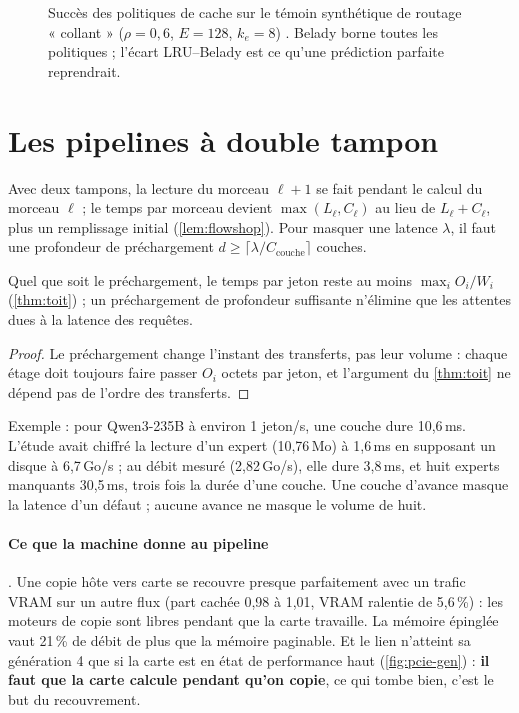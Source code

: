 \begin{figure}[ht]
\centering
\GrapheLocalite
\caption[Succès des politiques de cache sur un routage synthétique]{Succès des politiques de cache sur le témoin synthétique de routage « collant » ($\rho = 0{,}6$, $E = 128$, $k_e = 8$) \calc. Belady borne toutes les politiques ; l'écart LRU--Belady est ce qu'une prédiction parfaite reprendrait.}
\label{fig:localite}
\end{figure}

\section{Les pipelines à double tampon}\label{sec:double-tampon}

Avec deux tampons, la lecture du morceau $\ell+1$ se fait pendant le calcul du morceau $\ell$ ; le temps par morceau devient $\max(L_\ell, C_\ell)$ au lieu de $L_\ell + C_\ell$, plus un remplissage initial (\cref{lem:flowshop}). Pour masquer une latence $\lambda$, il faut une profondeur de préchargement $d \ge \lceil \lambda / C_{\text{couche}} \rceil$ couches.

\begin{proposition}\label{prop:volume}
Quel que soit le préchargement, le temps par jeton reste au moins $\max_i O_i/W_i$ (\cref{thm:toit}) ; un préchargement de profondeur suffisante n'élimine que les attentes dues à la latence des requêtes.
\end{proposition}

\begin{proof}
Le préchargement change l'instant des transferts, pas leur volume : chaque étage doit toujours faire passer $O_i$ octets par jeton, et l'argument du \cref{thm:toit} ne dépend pas de l'ordre des transferts.
\end{proof}

Exemple \calc : pour Qwen3-235B à environ 1 jeton/s, une couche dure 10,6\,ms. L'étude avait chiffré la lecture d'un expert (10,76\,Mo) à 1,6\,ms en supposant un disque à 6,7\,Go/s ; au débit mesuré (2,82\,Go/s), elle dure 3,8\,ms, et huit experts manquants 30,5\,ms, trois fois la durée d'une couche. Une couche d'avance masque la latence d'un défaut ; aucune avance ne masque le volume de huit.

\paragraph{Ce que la machine donne au pipeline} \mes. Une copie hôte vers carte se recouvre presque parfaitement avec un trafic VRAM sur un autre flux (part cachée 0,98 à 1,01, VRAM ralentie de 5,6\,\%) : les moteurs de copie sont libres pendant que la carte travaille. La mémoire épinglée vaut 21\,\% de débit de plus que la mémoire paginable. Et le lien n'atteint sa génération 4 que si la carte est en état de performance haut (\cref{fig:pcie-gen}) : \textbf{il faut que la carte calcule pendant qu'on copie}, ce qui tombe bien, c'est le but du recouvrement.

